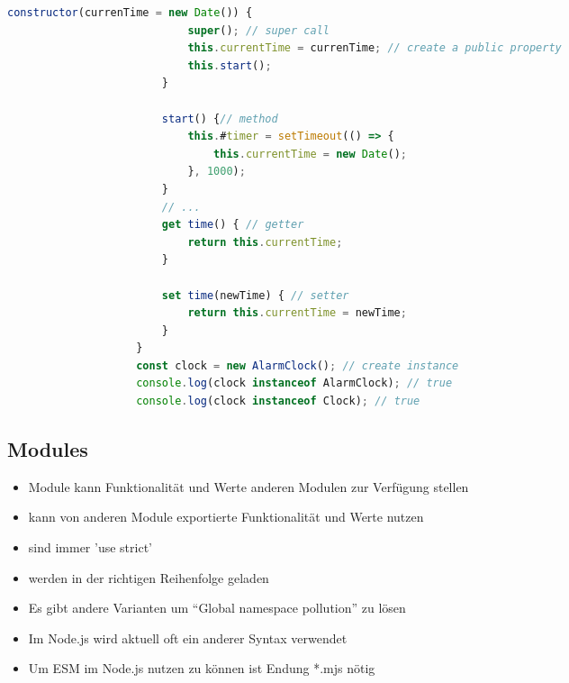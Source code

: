 \documentclass[a4paper, landscape, 8pt]{scrartcl}
\begin{document}
\begin{multicols*}{4}
\begin{lstlisting}[language=JavaScript]
                        constructor(currenTime = new Date()) {
                            super(); // super call
                            this.currentTime = currenTime; // create a public property
                            this.start();
                        }

                        start() {// method
                            this.#timer = setTimeout(() => {
                                this.currentTime = new Date();
                            }, 1000);
                        }
                        // ...
                        get time() { // getter
                            return this.currentTime;
                        }

                        set time(newTime) { // setter
                            return this.currentTime = newTime;
                        }
                    }
                    const clock = new AlarmClock(); // create instance
                    console.log(clock instanceof AlarmClock); // true
                    console.log(clock instanceof Clock); // true
        \end{lstlisting}

        \subsection{Modules}
        \begin{itemize}
            \item Module kann Funktionalität und Werte anderen Modulen zur Verfügung stellen
            \item kann von anderen Module exportierte Funktionalität und Werte nutzen
            \item sind immer 'use strict'
            \item werden in der richtigen Reihenfolge geladen
            \item Es gibt andere Varianten um \enquote{Global namespace pollution} zu lösen
            \item Im Node.js wird aktuell oft ein anderer Syntax verwendet
            \item Um ESM im Node.js nutzen zu können ist Endung *.mjs nötig
        \end{itemize}


\end{multicols*}
\end{document}
